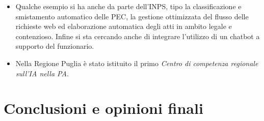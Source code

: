 \documentclass{article}
\begin{document}
\begin{justify}
\begin{itemize}
        \item Qualche esempio si ha anche da parte dell'INPS, tipo la classificazione e smistamento automatico delle PEC, la gestione ottimizzata del flusso delle richieste web ed elaborazione automatica degli atti in ambito legale e contenzioso. Infine si sta cercando anche di integrare l'utilizzo di un chatbot a supporto del funzionario.
        \item Nella Regione Puglia è stato istituito il primo \textit{Centro di competenza regionale sull’IA nella PA}.\citep{Ai_puglia_2023}
    \end{itemize}
\end{justify}

\centering
\section{Conclusioni e opinioni finali}
\end{document}

